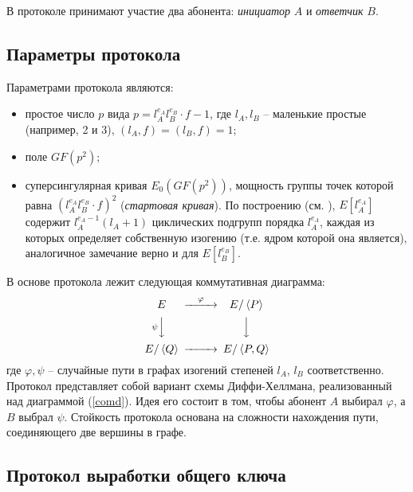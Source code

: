 \documentclass[a4paper,12pt]{article}
\newcommand{\tr}[1]{\left\langle #1\right\rangle}
\theoremstyle{definition}
\begin{document}
В протоколе принимают участие два абонента: \emph{инициатор} $A$ и \emph{ответчик} $B$.

\subsection*{Параметры протокола}

Параметрами протокола являются:
\begin{itemize}
 \item простое число $p$ вида $ p=l_A^{e_A}l_B^{e_B}\cdot f  - 1$, где $l_A,l_B$ -- маленькие простые (например, 2 и 3),
$(l_A,f)=(l_B,f)=1$;
\item поле $GF(p^2)$;
\item суперсингулярная кривая $E_0(GF(p^2))$, мощность группы точек которой равна $(l_A^{e_A}l_B^{e_B}\cdot f)^2$ (\emph{стартовая кривая}). По построению (см. \cite{DF}), $E[l_A^{e_A}]$ содержит $l_A^{e_A-1}(l_A+1)$ циклических подгрупп порядка $l_A^{e_A}$, каждая из которых определяет собственную изогению (т.е. ядром которой она является), аналогичное замечание  верно и для $E[l_B^{e_B}]$.
\end{itemize}

В основе протокола лежит следующая коммутативная диаграмма:
\begin{equation}\label{comd}
\begin{CD}
 E @>\varphi >> E/\tr{P} \\
 @V\psi VV @VVV \\
 E/\tr{Q} @>>> E/\tr{P,Q}
\end{CD}
\end{equation}
где $\varphi, \psi$ -- случайные пути в графах изогений степеней $l_A$, $l_B$ соответственно. Протокол представляет собой вариант схемы Диффи-Хеллмана, реализованный над диаграммой (\ref{comd}). Идея его состоит в том, чтобы абонент $A$ выбирал $\varphi$, а $B$ выбрал $\psi$. Стойкость протокола основана на 
сложности нахождения пути, соединяющего две вершины в графе. 

\subsection*{Протокол выработки общего ключа}


\end{document}
